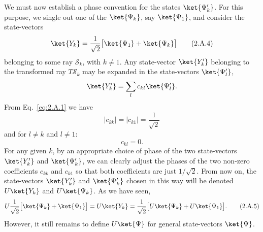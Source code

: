 We must now establish a phase convention for the states
$\ket{\Psi'_k}$. For this purpose, we single out one of the
$\ket{\Psi_k}$, say $\ket{\Psi_1}$, and consider the state-vectors
\begin{equation}
  \ket{Y_k}=\frac{1}{\sqrt{2}}
    \bigl[\ket{\Psi_1}+\ket{\Psi_k}\bigr]
  \tag{2.A.4}\label{eq:2.A.4}
\end{equation}
belonging to some ray $\mathcal{S}_k$, with $k\neq 1$. Any state-vector
$\ket{Y'_k}$ belonging to the transformed ray $T\mathcal{S}_k$ may be
expanded in the state-vectors $\ket{\Psi'_l}$,
\begin{equation*}
  \ket{Y'_k}=\sum_l c_{kl}\ket{\Psi'_l}.
\end{equation*}
From Eq.~\eqref{eq:2.A.1} we have
\begin{equation*}
  |c_{kk}|=|c_{k1}|=\frac{1}{\sqrt{2}}
\end{equation*}
and for $l\neq k$ and $l\neq 1$:
\begin{equation*}
  c_{kl}=0.
\end{equation*}
For any given $k$, by an appropriate choice of phase of the two
state-vectors $\ket{Y'_k}$ and $\ket{\Psi'_k}$, we can clearly adjust the
phases of the two non-zero coefficients $c_{kk}$ and $c_{k1}$ so that both
coefficients are just $1/\sqrt{2}$. From now on, the state-vectors
$\ket{Y'_k}$ and $\ket{\Psi'_k}$ chosen in this way will be denoted
$U\ket{Y_k}$ and $U\ket{\Psi_k}$. As we have seen,
\begin{equation}
  U\frac{1}{\sqrt{2}}
    \bigl[\ket{\Psi_k}+\ket{\Psi_1}\bigr]
  =U\ket{Y_k}
  =\frac{1}{\sqrt{2}}
    \bigl[U\ket{\Psi_k}+U\ket{\Psi_1}\bigr].
  \tag{2.A.5}\label{eq:2.A.5}
\end{equation}
However, it still remains to define $U\ket{\Psi}$ for general
state-vectors $\ket{\Psi}$.

